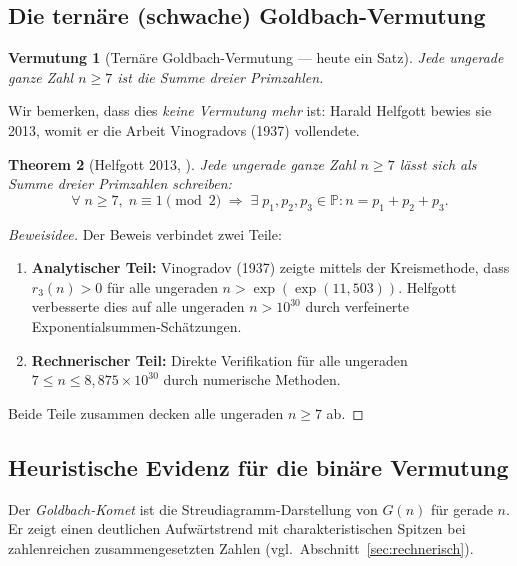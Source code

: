 \documentclass[12pt,a4paper]{amsart}
\newtheorem{theorem}{Theorem}[section]
\newtheorem{vermutung}[theorem]{Vermutung}
\theoremstyle{definition}
\newcommand{\Primes}{\mathbb{P}}
\begin{document}
\subsection{Die tern\"{a}re (schwache) Goldbach-Vermutung}

\begin{vermutung}[Tern\"{a}re Goldbach-Vermutung --- heute ein Satz]
\label{verm:goldbach-ternaer}
Jede ungerade ganze Zahl $n \geq 7$ ist die Summe dreier Primzahlen.
\end{vermutung}

Wir bemerken, dass dies \emph{keine Vermutung mehr} ist:
Harald Helfgott bewies sie 2013, womit er die Arbeit Vinogradovs (1937)
vollendete.

\begin{theorem}[Helfgott 2013, \cite{Helfgott2013}]\label{thm:helfgott}
Jede ungerade ganze Zahl $n \geq 7$ l\"{a}sst sich als Summe dreier
Primzahlen schreiben:
\[
  \forall\; n \geq 7,\; n \equiv 1 \pmod{2} \;\Longrightarrow\;
  \exists\; p_1, p_2, p_3 \in \Primes : n = p_1 + p_2 + p_3.
\]
\end{theorem}

\begin{proof}[Beweisidee]
Der Beweis verbindet zwei Teile:
\begin{enumerate}[label=(\roman*)]
\item \textbf{Analytischer Teil:} Vinogradov (1937) zeigte mittels der
      Kreismethode, dass $r_3(n) > 0$ f\"{u}r alle ungeraden
      $n > \exp(\exp(11{,}503))$.  Helfgott verbesserte dies auf alle
      ungeraden $n > 10^{30}$ durch verfeinerte Exponentialsummen-Sch\"{a}tzungen.
\item \textbf{Rechnerischer Teil:} Direkte Verifikation f\"{u}r alle
      ungeraden $7 \leq n \leq 8{,}875 \times 10^{30}$ durch numerische
      Methoden.
\end{enumerate}
Beide Teile zusammen decken alle ungeraden $n \geq 7$ ab.
\end{proof}

\subsection{Heuristische Evidenz f\"{u}r die bin\"{a}re Vermutung}

Der \emph{Goldbach-Komet} ist die Streudiagramm-Darstellung von $G(n)$
f\"{u}r gerade $n$.  Er zeigt einen deutlichen Aufw\"{a}rtstrend mit
charakteristischen Spitzen bei zahlenreichen zusammengesetzten Zahlen
(vgl.\ Abschnitt~\ref{sec:rechnerisch}).
\end{document}
